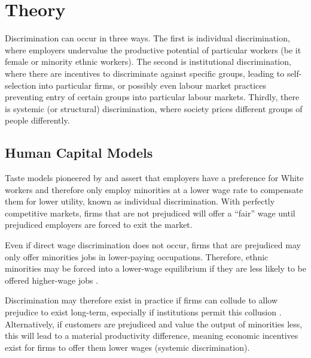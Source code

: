 \documentclass[class=article, crop=false]{standalone}
\begin{document}
\section{Theory}
\label{sec:Theory}
Discrimination can occur in three ways. The first is individual discrimination, where employers undervalue the productive potential of particular workers (be it female or minority ethnic workers). The second is institutional discrimination, where there are incentives to discriminate against specific groups, leading to self-selection into particular firms, or possibly even labour market practices preventing entry of certain groups into particular labour markets. Thirdly, there is systemic (or structural) discrimination, where society prices different groups of people differently.

\subsection{Human Capital Models}
\label{sec:Human Capital Models}
Taste models pioneered by \citet{Becker} and \citet{Arrow} assert that employers have a preference for White workers and therefore only employ minorities at a lower wage rate to compensate them for lower utility, known as individual discrimination. With perfectly competitive markets, firms that are not prejudiced will offer a \enquote{fair} wage until prejudiced employers are forced to exit the market.

Even if direct wage discrimination does not occur, firms that are prejudiced may only offer minorities jobs in lower-paying occupations. Therefore, ethnic minorities may be forced into a lower-wage equilibrium if they are less likely to be offered higher-wage jobs \citep{Coate}.

Discrimination may therefore exist in practice if firms can collude to allow prejudice to exist long-term, especially if institutions permit this collusion \citep{LundbergB}. Alternatively, if customers are prejudiced and value the output of minorities less, this will lead to a material productivity difference, meaning economic incentives exist for firms to offer them lower wages (systemic discrimination).
\end{document}
